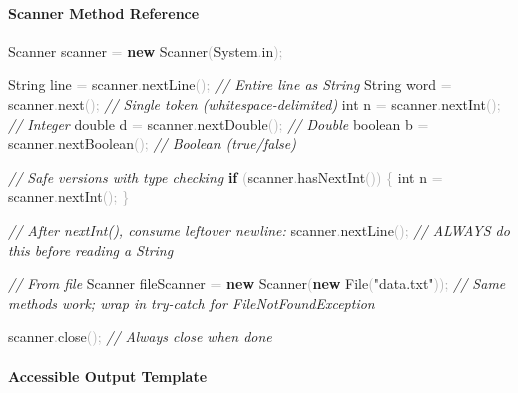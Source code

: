 \documentclass[
  justified,
  openright,
]{tufte-book}
\let\subsection\paragraph
\let\paragraph\paragraph
\newcommand{\KeywordTok}[1]{\textcolor{CodeKeyword}{\textbf{#1}}}  %
\newcommand{\StringTok}[1]{\textcolor{CodeString}{#1}}              %
\newcommand{\CommentTok}[1]{\textcolor{CodeComment}{\textit{#1}}}  %
\newcommand{\CodeFuncTok}[1]{\textcolor{CodeKeyword}{#1}}           %
\newcommand{\CodeTypeTok}[1]{\textcolor{CodeType}{#1}}              %
\newcommand{\OperatorTok}[1]{\textcolor{DarkGray}{#1}}              %
\newenvironment{Shaded}{%
  \begin{mdframed}[style=TufteCode]%
}{%
  \end{mdframed}%
}
\let\subsection\paragraph
\let\paragraph\paragraph
\begin{document}
\subsection{Scanner Method Reference}\label{scanner-method-reference}

\begin{Shaded}
\begin{Highlighting}[]
Scanner scanner \OperatorTok{=} \KeywordTok{new} Scanner\OperatorTok{(}System\OperatorTok{.}\CodeFuncTok{in}\OperatorTok{);}
 
String line   \OperatorTok{=} scanner\OperatorTok{.}\CodeFuncTok{nextLine}\OperatorTok{();}     \CommentTok{// Entire line as String}
String word   \OperatorTok{=} scanner\OperatorTok{.}\CodeFuncTok{next}\OperatorTok{();}         \CommentTok{// Single token (whitespace{-}delimited)}
\CodeTypeTok{int} n         \OperatorTok{=} scanner\OperatorTok{.}\CodeFuncTok{nextInt}\OperatorTok{();}      \CommentTok{// Integer}
\CodeTypeTok{double} d      \OperatorTok{=} scanner\OperatorTok{.}\CodeFuncTok{nextDouble}\OperatorTok{();}   \CommentTok{// Double}
\CodeTypeTok{boolean} b     \OperatorTok{=} scanner\OperatorTok{.}\CodeFuncTok{nextBoolean}\OperatorTok{();}  \CommentTok{// Boolean (true/false)}
 
\CommentTok{// Safe versions with type checking}
\KeywordTok{if} \OperatorTok{(}scanner\OperatorTok{.}\CodeFuncTok{hasNextInt}\OperatorTok{())} \OperatorTok{\{}
    \CodeTypeTok{int} n \OperatorTok{=} scanner\OperatorTok{.}\CodeFuncTok{nextInt}\OperatorTok{();}
\OperatorTok{\}}
 
\CommentTok{// After nextInt(), consume leftover newline:}
scanner\OperatorTok{.}\CodeFuncTok{nextLine}\OperatorTok{();}  \CommentTok{// ALWAYS do this before reading a String}
 
\CommentTok{// From file}
Scanner fileScanner \OperatorTok{=} \KeywordTok{new} Scanner\OperatorTok{(}\KeywordTok{new} File\OperatorTok{(}\StringTok{"data.txt"}\OperatorTok{));}
\CommentTok{// Same methods work; wrap in try{-}catch for FileNotFoundException}
 
scanner\OperatorTok{.}\CodeFuncTok{close}\OperatorTok{();}  \CommentTok{// Always close when done}
\end{Highlighting}
\end{Shaded}

\subsection{Accessible Output
Template}\label{accessible-output-template}
\end{document}

